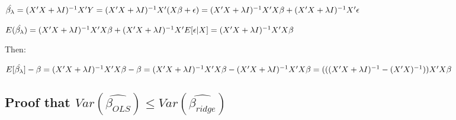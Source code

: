 \documentclass[]{article}
\begin{document}
\(\hat{\beta_{\lambda}} = (X^{\prime} X + \lambda I)^{-1} X^{\prime} Y \\ = (X^{\prime} X + \lambda I)^{-1} X^{\prime} (X \beta + \epsilon) \\ = (X^{\prime} X + \lambda I)^{-1} X^{\prime} X \beta + (X^{\prime} X + \lambda I)^{-1} X^{\prime} \epsilon\)

\(E(\hat{\beta_{\lambda}}) = (X^{\prime} X + \lambda I)^{-1} X^{\prime} X \beta + (X^{\prime} X + \lambda I)^{-1} X^{\prime} E[\epsilon | X] \\ = (X^{\prime} X + \lambda I)^{-1} X^{\prime} X \beta\)

Then:

\(E[\hat{\beta_{\lambda} }] - \beta = (X^{\prime} X + \lambda I)^{-1} X^{\prime} X \beta - \beta \\ = (X^{\prime} X + \lambda I)^{-1} X^{\prime} X \beta - (X^{\prime} X + \lambda I)^{-1} X^{\prime} X \beta \\ = (((X^{\prime} X + \lambda I)^{-1} - (X^{\prime} X)^{-1})) X^{\prime} X \beta\)

\hypertarget{proof-that-varhatbeta_ols-leq-varhatbeta_ridge}{%
\subsection{\texorpdfstring{Proof that
\(Var(\hat{\beta_{OLS}}) \leq Var(\hat{\beta_{ridge}})\)}{Proof that Var(\textbackslash{}hat\{\textbackslash{}beta\_\{OLS\}\}) \textbackslash{}leq Var(\textbackslash{}hat\{\textbackslash{}beta\_\{ridge\}\})}}\label{proof-that-varhatbeta_ols-leq-varhatbeta_ridge}}
\end{document}
